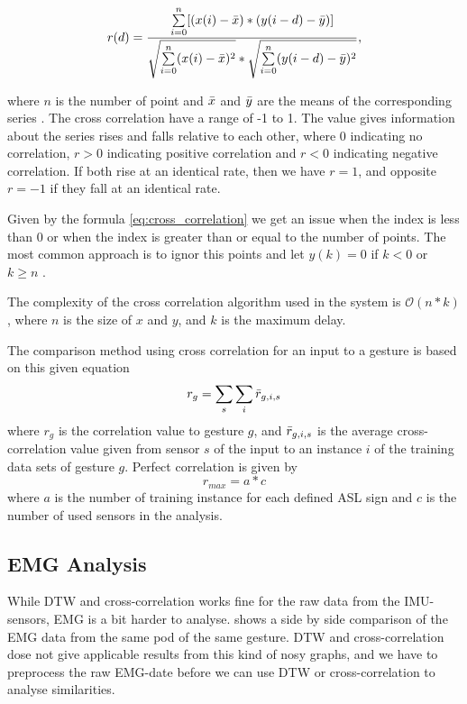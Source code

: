 \begin{equation}
\label{eq:cross_correlation}
    r(d) = \frac{\sum\limits_{i=0}\limits^{n} [(x(i) - \bar{x}) * (y(i-d) - \bar{y})]}{\sqrt{\sum\limits_{i=0}\limits^{n} (x(i) - \bar{x})^{2}} * \sqrt{\sum\limits_{i=0}\limits^{n} (y(i-d) - \bar{y})^{2}}},
\end{equation}

where $n$ is the number of point and $\bar{x}$ and $\bar{y}$ are the means of the corresponding series \cite{cross_correlation_theory}. The cross correlation have a range of -1 to 1. The value gives information about the series rises and falls relative to each other, where 0 indicating no correlation, $r > 0$ indicating positive correlation and $r < 0$ indicating negative correlation. If both rise at an identical rate, then we have $r = 1$, and opposite $r = -1$ if they fall at an identical rate. 

Given by the formula \ref{eq:cross_correlation} we get an issue when the index is less than 0 or when the index is greater than or equal to the number of points. The most common approach is to ignor this points and let $y(k) = 0$ if $k < 0$ or $k \geq n$ \cite{cross_correlation_code}.

The complexity of the cross correlation algorithm used in the system is $\mathcal{O}(n*k)$, where $n$ is the size of $x$ and $y$, and $k$ is the maximum delay.

The comparison method using cross correlation for an input to a gesture is based on this given equation
\begin{equation*}
    r_{g} = \sum_{s}\sum_{i}\bar{r}_{g,i,s} 
\end{equation*}
where $r_{g}$ is the correlation value to gesture $g$, and $\bar{r}_{g,i,s}$ is the average cross-correlation value given from sensor $s$ of the input to an instance $i$ of the training data sets of gesture $g$. Perfect correlation is given by
\begin{equation*}
    r_{max} = a*c
\end{equation*}
where $a$ is the number of training instance for each defined ASL sign and $c$ is the number of used sensors in the analysis.

\subsection{EMG Analysis}
\label{subsec:emg_analysis}
While DTW and cross-correlation works fine for the raw data from the IMU-sensors, EMG is a bit harder to analyse.  shows a side by side comparison of the EMG data from the same pod of the same gesture. DTW and cross-correlation dose not give applicable results from this kind of nosy graphs, and we have to preprocess the raw EMG-date before we can use DTW or cross-correlation to analyse similarities.

